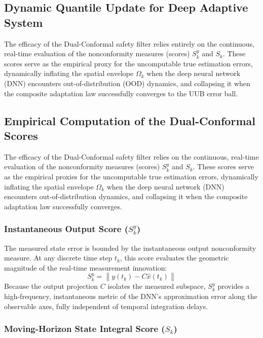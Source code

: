 \documentclass[letterpaper, 10 pt, conference]{ieeeconf}  %
\begin{document}
\subsection{Dynamic Quantile Update for Deep Adaptive System}

The efficacy of the Dual-Conformal safety filter relies entirely on the continuous, real-time evaluation of the nonconformity measures (scores) $S^y_k$ and $S_k$. These scores serve as the empirical proxy for the uncomputable true estimation errors, dynamically inflating the spatial envelope $\Omega_k$ when the deep neural network (DNN) encounters out-of-distribution (OOD) dynamics, and collapsing it when the composite adaptation law successfully converges to the UUB error ball.

\subsection{Empirical Computation of the Dual-Conformal Scores}

The efficacy of the Dual-Conformal safety filter relies on the continuous, real-time evaluation of the nonconformity measures (scores) $S^y_k$ and $S_k$. These scores serve as the empirical proxies for the uncomputable true estimation errors, dynamically inflating the spatial envelope $\Omega_k$ when the deep neural network (DNN) encounters out-of-distribution dynamics, and collapsing it when the composite adaptation law successfully converges.

\subsubsection{Instantaneous Output Score ($S^y_k$)}

The measured state error is bounded by the instantaneous output nonconformity measure. At any discrete time step $t_k$, this score evaluates the geometric magnitude of the real-time measurement innovation:
\begin{equation}
    S^y_k = \left\| y(t_k) - C\hat{x}(t_k) \right\|
\end{equation}
Because the output projection $C$ isolates the measured subspace, $S^y_k$ provides a high-frequency, instantaneous metric of the DNN's approximation error along the observable axes, fully independent of temporal integration delays.

\subsubsection{Moving-Horizon State Integral Score ($S_k$)}
\end{document}

